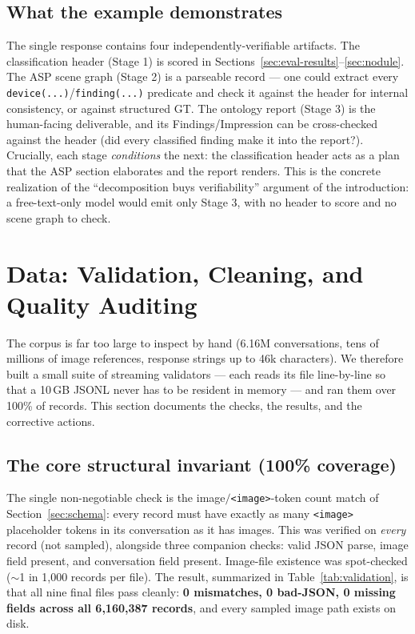 \documentclass[11pt,a4paper]{article}
\begin{document}
\subsection{What the example demonstrates}
The single response contains four independently-verifiable artifacts. The classification header (Stage 1) is scored in Sections~\ref{sec:eval-results}--\ref{sec:nodule}. The ASP scene graph (Stage 2) is a parseable record --- one could extract every \texttt{device(...)}/\texttt{finding(...)} predicate and check it against the header for internal consistency, or against structured GT. The ontology report (Stage 3) is the human-facing deliverable, and its Findings/Impression can be cross-checked against the header (did every classified finding make it into the report?). Crucially, each stage \emph{conditions} the next: the classification header acts as a plan that the ASP section elaborates and the report renders. This is the concrete realization of the ``decomposition buys verifiability'' argument of the introduction: a free-text-only model would emit only Stage 3, with no header to score and no scene graph to check.

\section{Data: Validation, Cleaning, and Quality Auditing}
\label{sec:validation}

The corpus is far too large to inspect by hand (6.16M conversations, tens of millions of image references, response strings up to 46k characters). We therefore built a small suite of streaming validators --- each reads its file line-by-line so that a 10\,GB JSONL never has to be resident in memory --- and ran them over 100\% of records. This section documents the checks, the results, and the corrective actions.

\subsection{The core structural invariant (100\% coverage)}
The single non-negotiable check is the image$/$\texttt{<image>}-token count match of Section~\ref{sec:schema}: every record must have exactly as many \texttt{<image>} placeholder tokens in its conversation as it has images. This was verified on \emph{every} record (not sampled), alongside three companion checks: valid JSON parse, image field present, and conversation field present. Image-file existence was spot-checked ($\sim$1 in 1{,}000 records per file). The result, summarized in Table~\ref{tab:validation}, is that all nine final files pass cleanly: \textbf{0 mismatches, 0 bad-JSON, 0 missing fields across all 6{,}160{,}387 records}, and every sampled image path exists on disk.
\end{document}
